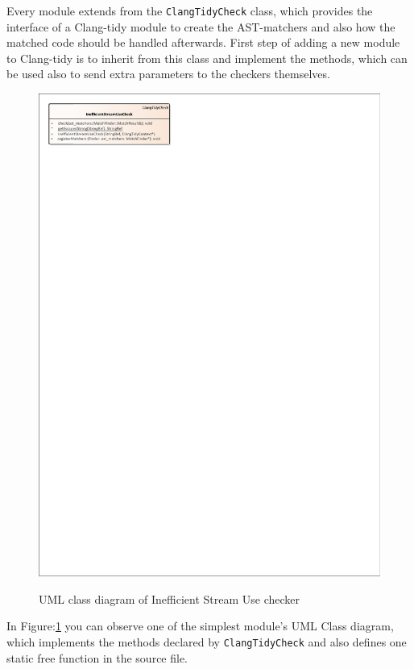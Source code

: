 \par Every module extends from the \verb|ClangTidyCheck| class, which provides the interface of a Clang-tidy module to create the AST-matchers and also how the matched code should be handled afterwards. First step of adding a new module to Clang-tidy is to inherit from this class and implement the methods, which can be used also to send extra parameters to the checkers themselves.
\begin{figure}[H]
	\caption{UML class diagram of Inefficient Stream Use checker}
	\centering
	\includegraphics[scale=1.8]{images/InefficientStreamUse.pdf}
	\label{stream_check_class}
\end{figure}
\par In Figure:\ref{stream_check_class} you can observe one of the simplest module's UML Class diagram, which implements the methods declared by \verb|ClangTidyCheck| and also defines one static free function in the source file.
